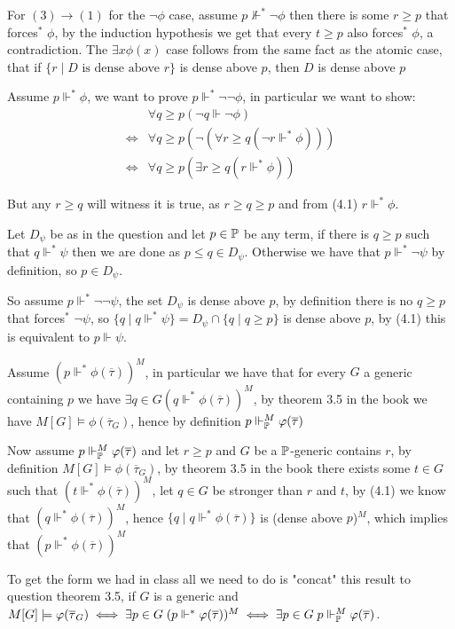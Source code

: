 \begin{cExercise}[][][author][4]
\begin{cPart}
		For $(3)\to(1)$ for the $\lnot\phi$ case, assume $p\not\Vdash^* \lnot\phi$ then there is some $r\ge p$ that forces$^*$ $\phi$, by the induction hypothesis we get that every $t\ge p$ also forces$^*$ $\phi$, a contradiction. The $\exists x\phi(x)$ case follows from the same fact as the atomic case, that if $\{r\mid D\text{ is dense above }r\}$ is dense above $p$, then $D$ is dense above $p$
	\end{cPart}
	\begin{cPart}
		Assume $p\Vdash^* \phi$, we want to prove $p\Vdash^*\lnot\lnot\phi$, in particular we want to show:
		\begin{align*}
			&\forall q\ge p (\lnot q\Vdash\lnot \phi)\\
			\iff&\forall q\ge p (\lnot (\forall r\ge q (\lnot r\Vdash^*\phi)))\\
			\iff&\forall q\ge p  (\exists r\ge q (r\Vdash^*\phi))
		\end{align*}
		
		But any $r\ge q$ will witness it is true, as $r\ge q\ge p$ and from (4.1) $r\Vdash^* \phi$.
	\end{cPart}
	\begin{cPart}
		Let $D_\psi$ be as in the question and let $p\in \Bbb P$ be any term, if there is $q\ge p$ such that $q\Vdash^* \psi$ then we are done as $p\le q\in D_\psi$.
		Otherwise we have that $p\Vdash^* \lnot\psi$ by definition, so $p\in D_\psi$.
		
		So assume $p\Vdash^*\lnot\lnot\psi$, the set $D_\psi$ is dense above $p$, by definition there is no $q\ge p$ that forces$^*$ $\lnot\psi$, so $\{q\mid q\Vdash^* \psi\}=D_\psi\cap \{q\mid q\ge p\}$ is dense above $p$, by (4.1) this is equivalent to $p\Vdash\psi$.
	\end{cPart}
\end{cExercise}
\begin{cExercise}[][][author][6]
	Assume $(p\Vdash^*\phi(\overline\tau))^M$, in particular we have that for every $G$ a generic containing $p$ we have $\exists q\in G (q\Vdash^* \phi(\overline{\tau}))^M$, by theorem 3.5 in the book we have $M[G]\models \phi(\overline{\tau}_G)$, hence by definition $p\Vdash_\Bbb P^M \phi(\overline{\tau})$
	
	Now assume $p\Vdash_\Bbb P^M \phi(\overline{\tau})$ and let $r\ge p$ and $G$ be a $\Bbb P$-generic contains $r$, by definition $M[G]\models \phi(\overline{\tau}_G)$, by theorem 3.5 in the book there exists some $t\in G$ such that $(t\Vdash^*\phi(\overline\tau))^M$, let $q\in G$ be stronger than $r$ and $t$, by (4.1) we know that $(q\Vdash^*\phi(\overline\tau))^M$, hence $\{q\mid q\Vdash^*\phi(\overline\tau)\}$ is (dense above $p$)$^M$, which implies that $(p\Vdash^*\phi(\overline\tau))^M$
	
	To get the form we had in class all we need to do is "concat" this result to question theorem 3.5, if $G$ is a generic and $M[G]\models \phi(\overline{\tau}_G)\iff \exists p\in G\; (p\force^*\phi(\overline{\tau}))^M\iff \exists p\in G\; p\force_\P^M \phi(\overline{\tau})$.
\end{cExercise}

